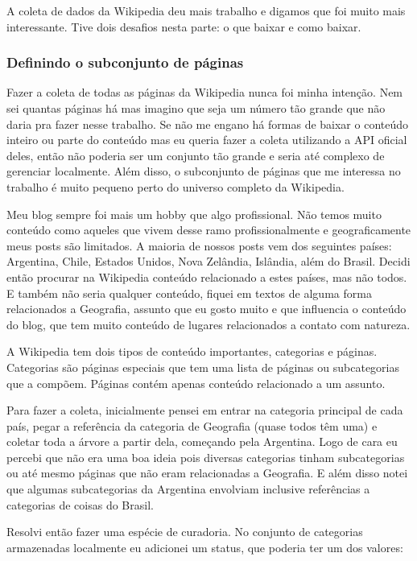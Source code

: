 A coleta de dados da Wikipedia deu mais trabalho e digamos que foi muito mais interessante. Tive dois desafios nesta parte: o que baixar e como baixar.

\subsubsection{Definindo o subconjunto de páginas}

Fazer a coleta de todas as páginas da Wikipedia nunca foi minha intenção. Nem sei quantas páginas há mas imagino que seja um número tão grande que 
não daria pra fazer nesse trabalho. Se não me engano há formas de baixar o conteúdo inteiro ou parte do conteúdo mas eu queria fazer a coleta 
utilizando a API oficial deles, então não poderia ser um conjunto tão grande e seria até complexo de gerenciar localmente. Além disso, o subconjunto 
de páginas que me interessa no trabalho é muito pequeno perto do universo completo da Wikipedia.

Meu blog sempre foi mais um hobby que algo profissional. Não temos muito conteúdo como aqueles que vivem desse ramo profissionalmente e geograficamente 
meus posts são limitados. A maioria de nossos posts vem dos seguintes países: Argentina, Chile, Estados Unidos, Nova Zelândia, Islândia, além do Brasil. 
Decidi então procurar na Wikipedia conteúdo relacionado a estes países, mas não todos. E também não seria qualquer conteúdo, fiquei em textos 
de alguma forma relacionados a Geografia, assunto que eu gosto muito e que influencia o conteúdo do blog, que tem muito conteúdo de lugares 
relacionados a contato com natureza.

A Wikipedia tem dois tipos de conteúdo importantes, categorias e páginas. Categorias são páginas especiais que tem uma lista de páginas ou 
subcategorias que a compõem. Páginas contém apenas conteúdo relacionado a um assunto.

Para fazer a coleta, inicialmente pensei em entrar na categoria principal de cada país, pegar a referência da categoria de Geografia 
(quase todos têm uma) e coletar toda a árvore a partir dela, começando pela Argentina. Logo de cara eu percebi que não era uma boa ideia 
pois diversas categorias tinham subcategorias ou até mesmo páginas que não eram relacionadas a Geografia. E além disso notei que algumas 
subcategorias da Argentina envolviam inclusive referências a categorias de coisas do Brasil. 

Resolvi então fazer uma espécie de curadoria. No conjunto de categorias armazenadas localmente eu adicionei um status, que poderia ter um dos valores:

